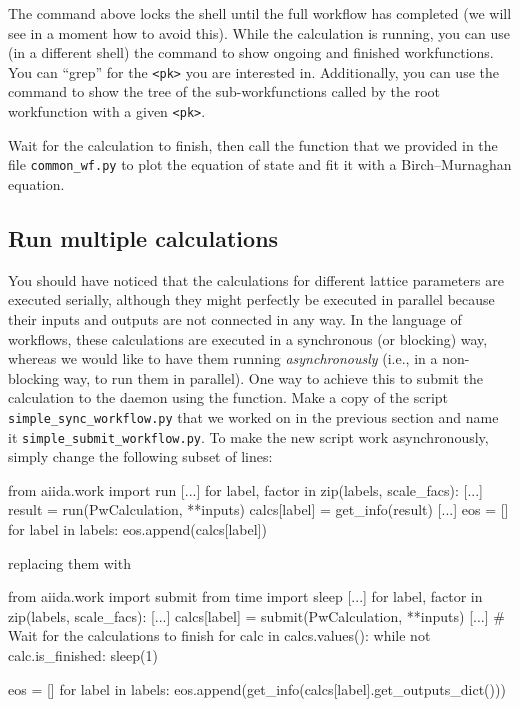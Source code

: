 The command above locks the shell until the full workflow has completed (we will see in a moment how to avoid this).
While the calculation is running, you can use (in a different shell) the command  to show ongoing and finished workfunctions. You can ``grep'' for the \texttt{<pk>} you are interested in. Additionally, you can use the command   to show the tree of the sub-workfunctions called by the root workfunction with a given \texttt{<pk>}.

\begin{tcolorbox}
Wait for the calculation to finish, then call the function  that we provided in the file \texttt{common\_wf.py} to plot the equation of state and fit it with a Birch--Murnaghan equation.
\end{tcolorbox}

\subsection{\label{sec:wf-multiple-calcs}Run multiple calculations}

You should have noticed that the calculations for different lattice parameters are executed serially, although they might perfectly be executed in parallel because their inputs and outputs are not connected in any way.
In the language of workflows, these calculations are executed in a synchronous (or blocking) way, whereas we would like to have them running \emph{asynchronously} (i.e., in a non-blocking way, to run them in parallel). 
One way to achieve this to submit the calculation to the daemon using the  function.
Make a copy of the script \texttt{simple\_sync\_workflow.py} that we worked on in the previous section and name it \texttt{simple\_submit\_workflow.py}.
To make the new script work asynchronously, simply change the following subset of lines:
\begin{pythoncommand}
from aiida.work import run
[...]
for label, factor in zip(labels, scale_facs):
    [...]
    result = run(PwCalculation, **inputs)
    calcs[label] = get_info(result)
[...]
eos = []
for label in labels:
    eos.append(calcs[label])
\end{pythoncommand}
replacing them with
\begin{pythoncommand}
from aiida.work import submit
from time import sleep
[...]
for label, factor in zip(labels, scale_facs):
    [...]
    calcs[label] = submit(PwCalculation, **inputs)
[...]
    # Wait for the calculations to finish
    for calc in calcs.values():
        while not calc.is_finished:
            sleep(1)

eos = []
for label in labels:
    eos.append(get_info(calcs[label].get_outputs_dict()))
\end{pythoncommand}

